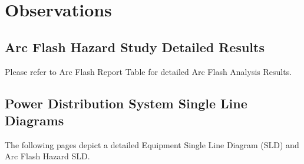 \section{Observations}
\label{af:observations}

\subsection{Arc Flash Hazard Study Detailed Results}
\label{af:observations:at}

Please refer to Arc Flash Report Table for detailed Arc Flash Analysis Results.

\pagebreak

\subsection{Power Distribution System Single Line Diagrams}
\label{af:observations:sld}

The following pages depict a detailed Equipment Single Line Diagram (SLD) and Arc Flash Hazard SLD.